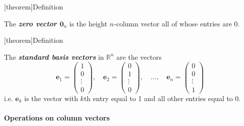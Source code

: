 \documentclass[12pt]{report}
\theoremstyle{definition}
\begin{document}
[theorem]{Definition}
\begin{zero vector}
    The \textbf{\emph{zero vector $\pmb{0}_n$}} is the height $n$-column vector all of whose entries are 0.
\end{zero vector}


[theorem]{Definition}
\begin{standard basis vector}
    The \textbf{\emph{standard basis vectors}} in $\mathbb{R}^{n}$ are the vectors\[
        \pmb{e}_1 = \begin{pmatrix}
                1\\
                0\\
                \vdots\\
                0
        \end{pmatrix}, \quad
        \pmb{e}_2 = \begin{pmatrix}
                0\\
                1\\
                \vdots\\
                0
        \end{pmatrix}, \quad \ldots, \quad
        \pmb{e}_n = \begin{pmatrix}
                0\\
                0\\
                \vdots\\
                1
        \end{pmatrix}
    \]
    i.e. $\pmb{e}_k$ is the vector with $k$th entry equal to 1 and all other entries equal to 0.
\end{standard basis vector}

\paragraph{Operations on column vectors}
\end{document}
